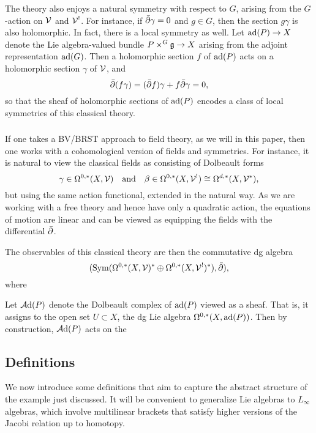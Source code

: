 The theory also enjoys a natural symmetry with respect to $G$,
arising from the $G$-action on $\mathcal V$ and $\mathcal V^!$.
For instance, if $\Bar{\partial} \gamma = 0$ and $g \in G$, then the section $g \gamma$ is also holomorphic.
In fact, there is a local symmetry as well.
Let ${\rm ad}(P) \to X$ denote the Lie algebra-valued bundle $P \times^G \mathfrak g \to X$ arising from the adjoint representation ${\rm ad}(G)$.
Then a holomorphic section $f$ of ${\rm ad}(P)$ acts on a holomorphic section $\gamma$ of $\mathcal V$,
and 
\[
\Bar{\partial}(f \gamma) =  (\Bar{\partial} f) \gamma + f \Bar{\partial} \gamma = 0,
\]
so that the sheaf of holomorphic sections of ${\rm ad}(P)$ encodes a class of local symmetries of this classical theory.

\subsubsection{}

If one takes a BV/BRST approach to field theory, as we will in this paper,
then one works with a cohomological version of fields and symmetries.
For instance, it is natural to view the classical fields as consisting of Dolbeault forms
\[
\gamma \in \Omega^{0,*}(X,\mathcal V) \quad \text{and} \quad \beta \in \Omega^{0,*}(X, \mathcal V^!) \cong \Omega^{d,*}(X, \mathcal V^*),
\]
but using the same action functional, extended in the natural way.
As we are working with a free theory and hence have only a quadratic action,
the equations of motion are linear and can be viewed as equipping the fields with the differential $\Bar{\partial}$.


The observables of this classical theory are then the commutative dg algebra
\[
({\rm Sym}(\Omega^{0,*}(X,\mathcal V)^* \oplus \Omega^{0,*}(X, \mathcal V^!)^*), \Bar{\partial}),
\]
where 

Let $\mathcal A{\rm d}(P)$ denote the Dolbeault complex of ${\rm ad}(P)$ viewed as a sheaf.
That is, it assigns to the open set $U \subset X$, the dg Lie algebra $\Omega^{0,*}(X,{\rm ad}(P))$.
Then by construction, $\mathcal A{\rm d}(P)$ acts on the 

\subsection{Definitions}

We now introduce some definitions that aim to capture the abstract structure of the example just discussed.
It will be convenient to generalize Lie algebras to $L_\infty$ algebras,
which involve multilinear brackets that satisfy higher versions of the Jacobi relation up to homotopy.

